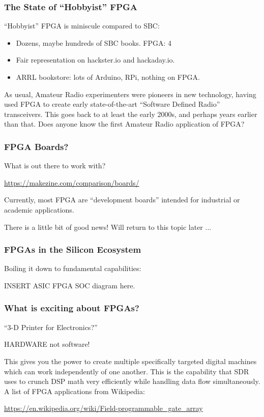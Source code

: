 \documentclass{beamer}
\begin{document}
\begin{frame}
\frametitle{The State of ``Hobbyist'' FPGA}

``Hobbyist'' FPGA is miniscule compared to SBC:

\begin{itemize}
	\item Dozens, maybe hundreds of SBC books.  FPGA: 4
	\item Fair representation on hackster.io and hackaday.io.
	\item ARRL bookstore: lots of Arduino, RPi, nothing on FPGA.
\end{itemize}

As usual, Amateur Radio experimenters were pioneers in new technology, having used FPGA to create early state-of-the-art ``Software Defined Radio'' transceivers.  This goes back to at least the early 2000s, and perhaps years earlier than that.  Does anyone know the first Amateur Radio application of FPGA? 

\end{frame}

\begin{frame}
\frametitle{FPGA Boards?}

What is out there to work with?

\url{https://makezine.com/comparison/boards/}

Currently, most FPGA are ``development boards'' intended for industrial or academic applications.

There is a little bit of good news!  Will return to this topic later ...

\end{frame}

\begin{frame}
\frametitle{FPGAs in the Silicon Ecosystem}

Boiling it down to fundamental capabilities:

INSERT ASIC FPGA SOC diagram here.


\end{frame}

\begin{frame}
\frametitle{What is exciting about FPGAs?}

``3-D Printer for Electronics?''

HARDWARE not software!

This gives you the power to create multiple specifically targeted digital machines which can work independently of one another.  This is the capability that SDR uses to crunch DSP math very efficiently while handling data flow simultaneously.  A list of FPGA applications from Wikipedia:

\url{https://en.wikipedia.org/wiki/Field-programmable_gate_array}

\end{frame}
\end{document}
